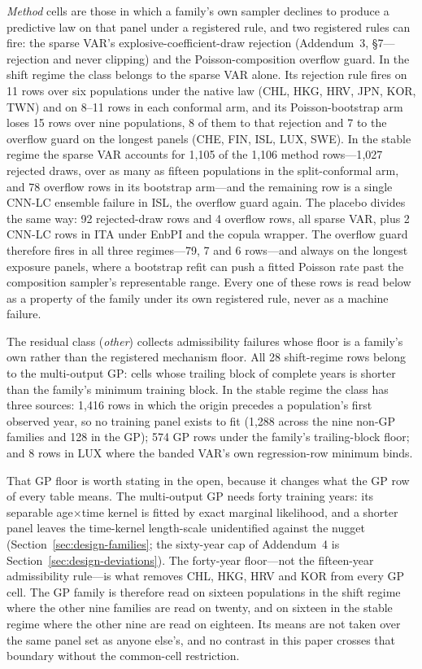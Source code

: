 \emph{Method} cells are those in which a family's own sampler declines to
produce a predictive law on that panel under a registered rule, and two
registered rules can fire: the sparse VAR's explosive-coefficient-draw
rejection (Addendum~3, \S7---rejection and never clipping) and the
Poisson-composition overflow guard. In the shift regime the class belongs
to the sparse VAR alone. Its rejection rule fires on 11 rows over six
populations under the native law (CHL, HKG, HRV, JPN, KOR, TWN) and on
8--11 rows in each conformal arm, and its Poisson-bootstrap arm loses 15
rows over nine populations, 8 of them to that rejection and 7 to the
overflow guard on the longest panels (CHE, FIN, ISL, LUX, SWE). In the
stable regime the sparse VAR accounts for 1{,}105 of the 1{,}106 method
rows---1{,}027 rejected draws, over as many as fifteen populations in the
split-conformal arm, and 78 overflow rows in its bootstrap arm---and the
remaining row is a single CNN-LC ensemble failure in ISL, the overflow
guard again. The placebo divides the same way: 92 rejected-draw rows and 4
overflow rows, all sparse VAR, plus 2 CNN-LC rows in ITA under EnbPI and
the copula wrapper. The overflow guard therefore fires in all three
regimes---79, 7 and 6 rows---and always on the longest exposure panels,
where a bootstrap refit can push a fitted Poisson rate past the
composition sampler's representable range. Every one of these rows is read
below as a property of the family under its own registered rule, never as
a machine failure.

The residual class (\emph{other}) collects admissibility failures whose
floor is a family's own rather than the registered mechanism floor. All 28
shift-regime rows belong to the multi-output GP: cells whose trailing
block of complete years is shorter than the family's minimum training
block. In the stable regime the class has three sources: 1{,}416 rows in
which the origin precedes a population's first observed year, so no
training panel exists to fit (1{,}288 across the nine non-GP families and
128 in the GP); 574 GP rows under the family's trailing-block floor; and 8
rows in LUX where the banded VAR's own regression-row minimum binds.

That GP floor is worth stating in the open, because it changes what the GP
row of every table means. The multi-output GP needs forty training years:
its separable age$\times$time kernel is fitted by exact marginal
likelihood, and a shorter panel leaves the time-kernel length-scale
unidentified against the nugget (Section~\ref{sec:design-families}; the
sixty-year cap of Addendum~4 is Section~\ref{sec:design-deviations}). The
forty-year floor---not the fifteen-year admissibility rule---is what
removes CHL, HKG, HRV and KOR from every GP cell. The GP family is
therefore read on sixteen populations in the shift regime where the other
nine families are read on twenty, and on sixteen in the stable regime
where the other nine are read on eighteen. Its means are not taken over
the same panel set as anyone else's, and no contrast in this paper crosses
that boundary without the common-cell restriction.

